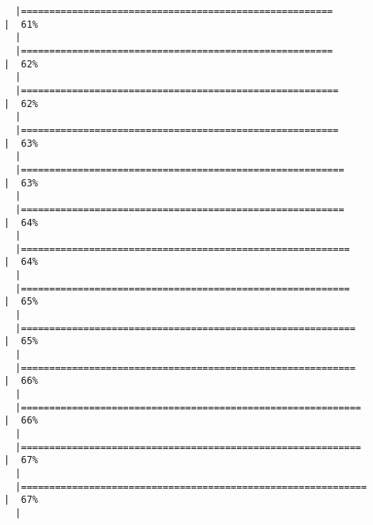 \documentclass[12pt]{article}
\begin{document}
\begin{verbatim}
  |=======================================================                                   |  61%
  |                                                                                                
  |=======================================================                                   |  62%
  |                                                                                                
  |========================================================                                  |  62%
  |                                                                                                
  |========================================================                                  |  63%
  |                                                                                                
  |=========================================================                                 |  63%
  |                                                                                                
  |=========================================================                                 |  64%
  |                                                                                                
  |==========================================================                                |  64%
  |                                                                                                
  |==========================================================                                |  65%
  |                                                                                                
  |===========================================================                               |  65%
  |                                                                                                
  |===========================================================                               |  66%
  |                                                                                                
  |============================================================                              |  66%
  |                                                                                                
  |============================================================                              |  67%
  |                                                                                                
  |=============================================================                             |  67%
  |                                                                                                

\end{verbatim}
\end{document}
